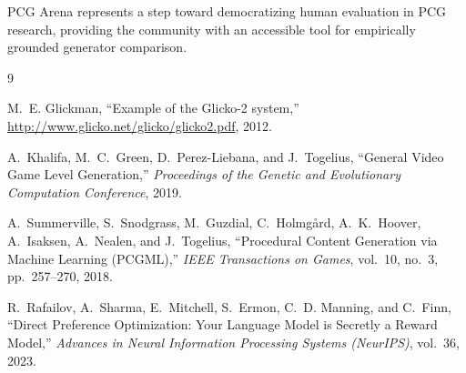 \documentclass[11pt,a4paper]{article}
\theoremstyle{plain}
\theoremstyle{definition}
\theoremstyle{remark}
\begin{document}
PCG Arena represents a step toward democratizing human evaluation in PCG research, providing the community with an accessible tool for empirically grounded generator comparison.

\newpage

% 

\begin{thebibliography}{9}

M.~E. Glickman, ``Example of the Glicko-2 system,'' 
\url{http://www.glicko.net/glicko/glicko2.pdf}, 2012.

A.~Khalifa, M.~C.~Green, D.~Perez-Liebana, and J.~Togelius, ``General Video Game Level Generation,''
\emph{Proceedings of the Genetic and Evolutionary Computation Conference}, 2019.

A.~Summerville, S.~Snodgrass, M.~Guzdial, C.~Holmg{\aa}rd, A.~K.~Hoover, A.~Isaksen, A.~Nealen, and J.~Togelius, ``Procedural Content Generation via Machine Learning (PCGML),''
\emph{IEEE Transactions on Games}, vol.~10, no.~3, pp.~257--270, 2018.

R.~Rafailov, A.~Sharma, E.~Mitchell, S.~Ermon, C.~D. Manning, and C.~Finn, ``Direct Preference Optimization: Your Language Model is Secretly a Reward Model,''
\emph{Advances in Neural Information Processing Systems (NeurIPS)}, vol.~36, 2023.

\end{thebibliography}
\end{document}
